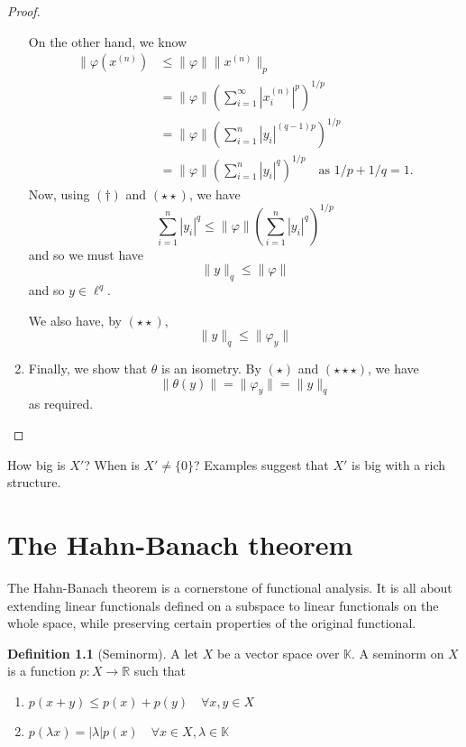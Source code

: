 \documentclass[10pt, oneside, reqno]{amsbook}
\theoremstyle{plain}%
\theoremstyle{definition}
\newtheorem{defn}[thm]{Definition}
\theoremstyle{remark}
\newcommand{\R}{\mathbb{R}}
\newcommand{\K}{\mathbb{K}}
\renewcommand{\phi}{\varphi}
\begin{document}
\begin{proof}
\begin{enumerate}[(1)]
        On the other hand, we know \begin{align*}
            \| \phi( x^{(n)}) &\leq \| \phi \| \| x^{(n)} \|_p \\
                            &= \| \phi \| \left( \sum_{i=1}^\infty |x_i^{(n)}|^p \right)^{1/p} \\
                            &= \| \phi \| \left( \sum_{i = 1}^n |y_i |^{(q-1)p} \right)^{1/p} \\
                            &= \| \phi \| \left( \sum_{i=1}^n |y_i |^q \right)^{1/p} \quad \text{as $1/p + 1/q = 1$.} \tag{$\star \star$}
        \end{align*}
        Now, using $(\dagger)$ and $(\star \star)$, we have \[
             \sum_{i=1}^n |y_i|^q  \leq \| \phi \| \left( \sum_{i=1}^n | y_i |^q \right)^{1/p} 
        \] and so we must have \[
            \| y \|_q \leq \| \phi \| \tag{$\star \star \star$}
        \]
        and so $y \in \ell^q$.
        
        We also have, by $(\star \star)$,\[
            \| y \|_q \leq \| \phi_y \|
        \] 
        \item Finally, we show that $\theta$ is an isometry.  By $(\star)$ and $(\star \star \star)$, we have \[
            \| \theta(y) \| = \| \phi_y \| = \| y \|_q 
        \] as required.\qedhere
         
    \end{enumerate} 
\end{proof} 

How big is $X'$?  When is $X' \neq \{ 0 \}$?  Examples suggest that $X'$ is big with a rich structure.  

\chapter{The Hahn-Banach theorem} %
The Hahn-Banach theorem is a cornerstone of functional analysis.  It is all about extending linear functionals defined on a subspace to linear functionals on the whole space, while preserving certain properties of the original functional.

\begin{defn}[Seminorm]
A let $X$ be a vector space over $\K$.  A seminorm on $X$ is a function $p : X \rightarrow \R$ such that 
\begin{enumerate}[(1)]
    \item $p(x+y) \leq p(x) + p(y) \quad \forall x,y \in X$
    \item $p(\lambda x) = | \lambda | p(x) \quad \forall x \in X, \lambda \in \K$
\end{enumerate}
\end{defn}
\end{document}
